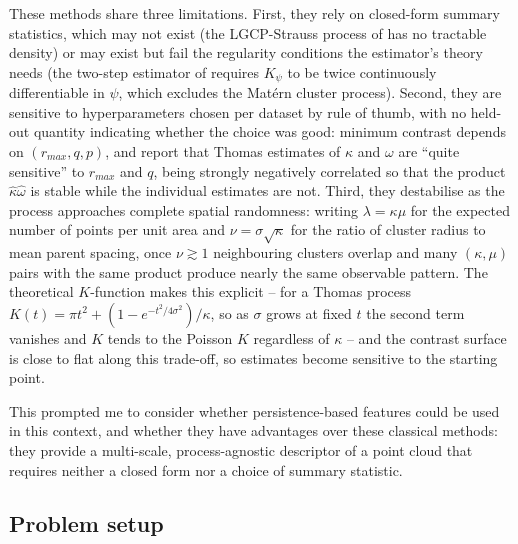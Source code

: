 \documentclass[11pt,a4paper]{article}
\begin{document}
These methods share three limitations. First, they rely on closed-form summary
statistics, which may not exist (the LGCP-Strauss process of
\citet{vihrs2022neural} has no tractable density) or may exist but fail the
regularity conditions the estimator's theory needs (the two-step estimator of
\citet{waagepetersen2009twostep} requires $K_\psi$ to be twice continuously
differentiable in $\psi$, which excludes the Mat\'ern cluster process). Second,
they are sensitive to hyperparameters chosen per dataset by rule of thumb, with
no held-out quantity indicating whether the choice was good: minimum contrast
depends on $(r_{max}, q, p)$, and \citet{waagepetersen2009twostep} report that
Thomas estimates of $\kappa$ and $\omega$ are ``quite sensitive'' to $r_{max}$
and $q$, being strongly negatively correlated so that the product
$\hat\kappa\hat\omega$ is stable while the individual estimates are not. Third,
they destabilise as the process approaches complete spatial randomness: writing
$\lambda=\kappa\mu$ for the expected number of points per unit area and
$\nu = \sigma\sqrt{\kappa}$ for the ratio of cluster radius to mean parent
spacing, once $\nu \gtrsim 1$ neighbouring clusters overlap and many
$(\kappa,\mu)$ pairs with the same product produce nearly the same observable
pattern. The theoretical $K$-function makes this explicit -- for a Thomas
process $K(t) = \pi t^2 + (1-e^{-t^2/4\sigma^2})/\kappa$, so as $\sigma$ grows
at fixed $t$ the second term vanishes and $K$ tends to the Poisson $K$
regardless of $\kappa$ -- and the contrast surface is close to flat along this
trade-off, so estimates become sensitive to the starting point.

This prompted me to consider whether persistence-based features could be used in
this context, and whether they have advantages over these classical methods:
they provide a multi-scale, process-agnostic descriptor of a point cloud that
requires neither a closed form nor a choice of summary statistic.

\subsection{Problem setup}
\label{ssec:setup}
\end{document}
